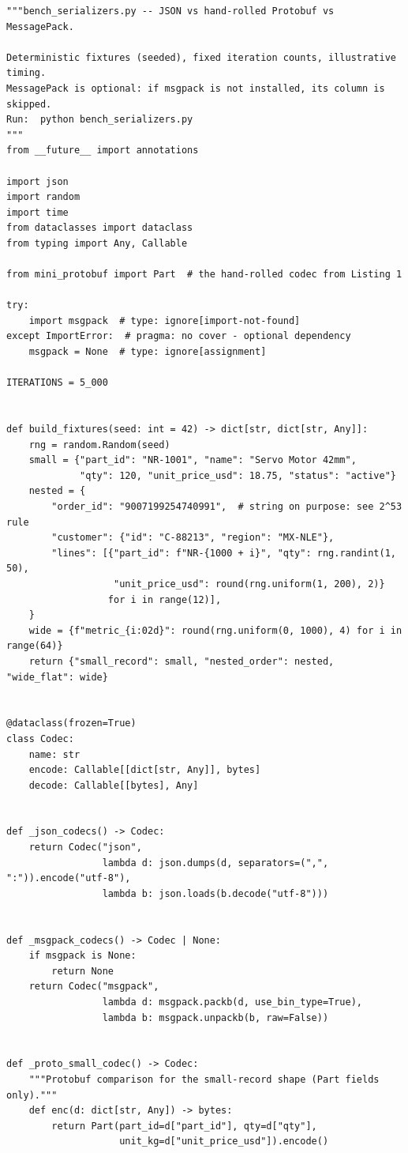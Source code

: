 \begin{verbatim}
"""bench_serializers.py -- JSON vs hand-rolled Protobuf vs MessagePack.

Deterministic fixtures (seeded), fixed iteration counts, illustrative timing.
MessagePack is optional: if msgpack is not installed, its column is skipped.
Run:  python bench_serializers.py
"""
from __future__ import annotations

import json
import random
import time
from dataclasses import dataclass
from typing import Any, Callable

from mini_protobuf import Part  # the hand-rolled codec from Listing 1

try:
    import msgpack  # type: ignore[import-not-found]
except ImportError:  # pragma: no cover - optional dependency
    msgpack = None  # type: ignore[assignment]

ITERATIONS = 5_000


def build_fixtures(seed: int = 42) -> dict[str, dict[str, Any]]:
    rng = random.Random(seed)
    small = {"part_id": "NR-1001", "name": "Servo Motor 42mm",
             "qty": 120, "unit_price_usd": 18.75, "status": "active"}
    nested = {
        "order_id": "9007199254740991",  # string on purpose: see 2^53 rule
        "customer": {"id": "C-88213", "region": "MX-NLE"},
        "lines": [{"part_id": f"NR-{1000 + i}", "qty": rng.randint(1, 50),
                   "unit_price_usd": round(rng.uniform(1, 200), 2)}
                  for i in range(12)],
    }
    wide = {f"metric_{i:02d}": round(rng.uniform(0, 1000), 4) for i in range(64)}
    return {"small_record": small, "nested_order": nested, "wide_flat": wide}


@dataclass(frozen=True)
class Codec:
    name: str
    encode: Callable[[dict[str, Any]], bytes]
    decode: Callable[[bytes], Any]


def _json_codecs() -> Codec:
    return Codec("json",
                 lambda d: json.dumps(d, separators=(",", ":")).encode("utf-8"),
                 lambda b: json.loads(b.decode("utf-8")))


def _msgpack_codecs() -> Codec | None:
    if msgpack is None:
        return None
    return Codec("msgpack",
                 lambda d: msgpack.packb(d, use_bin_type=True),
                 lambda b: msgpack.unpackb(b, raw=False))


def _proto_small_codec() -> Codec:
    """Protobuf comparison for the small-record shape (Part fields only)."""
    def enc(d: dict[str, Any]) -> bytes:
        return Part(part_id=d["part_id"], qty=d["qty"],
                    unit_kg=d["unit_price_usd"]).encode()


\end{verbatim}
